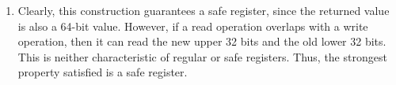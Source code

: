\documentclass[conference,compsoc]{IEEEtran}
\begin{document}
\begin{enumerate}
    \item Clearly, this construction guarantees a safe register, since the
    returned value is also a 64-bit value. However, if a read operation overlaps
    with a write operation, then it can read the new upper 32 bits and the old
    lower 32 bits. This is neither characteristic of regular or safe registers.
    Thus, the strongest property satisfied is a safe register.
\end{enumerate}
\end{document}
